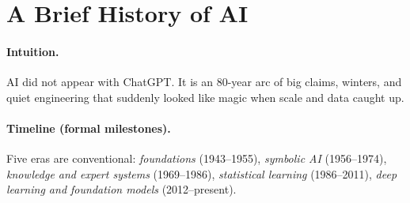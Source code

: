 \section{A Brief History of AI}
\label{sec:history}
\paragraph{Intuition.} AI did not appear with ChatGPT. It is an 80-year arc of big claims, winters, and quiet engineering that suddenly looked like magic when scale and data caught up.

\paragraph{Timeline (formal milestones).} Five eras are conventional: \emph{foundations} (1943--1955), \emph{symbolic AI} (1956--1974), \emph{knowledge and expert systems} (1969--1986), \emph{statistical learning} (1986--2011), \emph{deep learning and foundation models} (2012--present).

